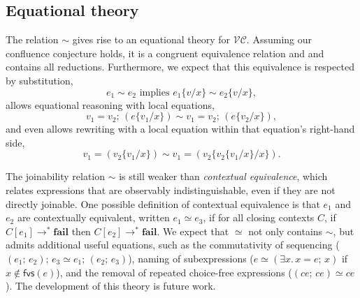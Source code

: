 \documentclass[acmsmall,review,dvipsnames]{acmart}
\newcommand{\Varid}[1]{\mathit{#1}}
\newcommand{\versecalc}{$\mathcal{VC}$}
\newcommand{\freevars}[1]{\mathsf{fvs}(#1)}
\newcommand{\subst}[3]{#1\{#3/#2\}}
\newcommand{\movesto}{\longrightarrow}
\begin{document}
\subsection{Equational theory}

The relation \ensuremath{\mathrel{\sim}} gives rise to an equational theory for {\versecalc}. Assuming our confluence conjecture holds, it is a congruent equivalence relation and and contains all reductions. Furthermore, we expect that this equivalence is respected by substitution,
\[ \ensuremath{\Varid{e}_{\mathrm{1}}\mathrel{\sim}\Varid{e}_{\mathrm{2}}} \text{ implies }  \ensuremath{\subst{\Varid{e}_{\mathrm{1}}}{\Varid{x}}{\Varid{v}}\mathrel{\sim}\subst{\Varid{e}_{\mathrm{2}}}{\Varid{x}}{\Varid{v}}}, \]
allows equational reasoning with local equations,
\[ \ensuremath{\Varid{v}_{\mathrm{1}}\mathrel{=}\Varid{v}_{\mathrm{2}};\,(\subst{\Varid{e}}{\Varid{x}}{\Varid{v}_{\mathrm{1}}})\mathrel{\sim}\Varid{v}_{\mathrm{1}}\mathrel{=}\Varid{v}_{\mathrm{2}};\,(\subst{\Varid{e}}{\Varid{x}}{\Varid{v}_{\mathrm{2}}})}, \]
and even allows rewriting with a local equation within that equation's right-hand side,
\[ \ensuremath{\Varid{v}_{\mathrm{1}}\mathrel{=}(\subst{\Varid{v}_{\mathrm{2}}}{\Varid{x}}{\Varid{v}_{\mathrm{1}}})\mathrel{\sim}\Varid{v}_{\mathrm{1}}\mathrel{=}(\subst{\Varid{v}_{\mathrm{2}}}{\Varid{x}}{\subst{\Varid{v}_{\mathrm{2}}}{\Varid{x}}{\Varid{v}_{\mathrm{1}}}})}. \]

The joinability relation \ensuremath{\mathrel{\sim}} is still weaker than \emph{contextual equivalence}, which relates expressions that are observably indistinguishable, even if they are not directly joinable. One possible definition of contextual equivalence is that $e_1$ and $e_2$ are contextually equivalent, written \ensuremath{\Varid{e}_{\mathrm{1}}\mathrel{\simeq}\Varid{e}_{\mathrm{3}}}, if for all closing contexts $C$, if $C[e_1] \movesto^\ast \ensuremath{\textbf{fail}}$ then $C[e_2] \movesto^\ast \ensuremath{\textbf{fail}}$. We expect that \ensuremath{\mathrel{\simeq}} not only contains \ensuremath{\mathrel{\sim}}, but admits additional useful equations, such as the commutativity of sequencing
(\ensuremath{(\Varid{e}_{\mathrm{1}};\,\Varid{e}_{\mathrm{2}});\,\Varid{e}_{\mathrm{3}}\mathrel{\simeq}\Varid{e}_{\mathrm{1}};\,(\Varid{e}_{\mathrm{2}};\,\Varid{e}_{\mathrm{3}})}),
naming of subexpressions
(\ensuremath{\Varid{e}\mathrel{\simeq}(\exists\Varid{x}.\,\Varid{x}\mathrel{=}\Varid{e};\,\Varid{x})} if $x \notin\freevars{e}$),
and the removal of repeated choice-free expressions
(\ensuremath{(\Varid{ce};\,\Varid{ce})\mathrel{\simeq}\Varid{ce}}).  The development of this theory is future work.
\end{document}
